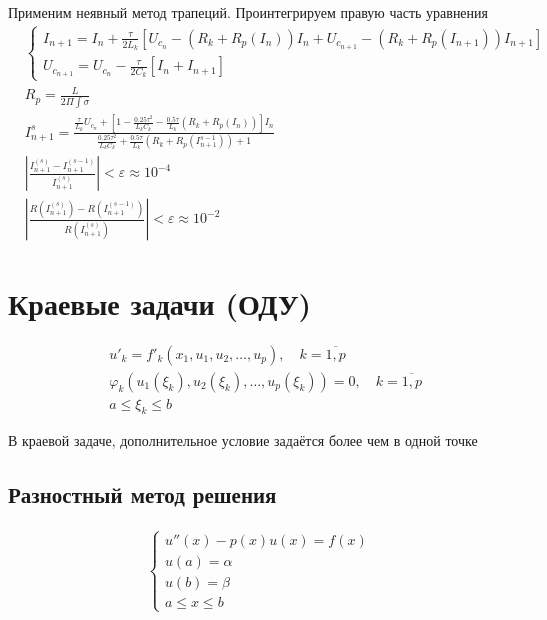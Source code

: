 Применим неявный метод трапеций. Проинтегрируем правую часть уравнения
\begin{align*}
	&\begin{cases*}
		I_{n+1} = I_n + \frac{\tau}{2 L_k} [U_{c_n} - (R_k + R_p(I_n)) I_n + U_{c_{n+1}} - (R_k + R_p(I_{n+1})) I_{n+1}]\\
		U_{c_{n+1}} = U_{c_n} - \frac{\tau}{2C_k} [ I_n + I_{n+1} ]
	\end{cases*}
	\\
	&R_p = \frac{L}{2\Pi \int \sigma}
	\\
	&I^{s}_{n+1} = \frac{\frac{\tau}{L_k} U_{c_n} + [  1 - \frac{0.25 \tau^2}{L_k C_k} - \frac{0.5 \tau}{L_k} (R_k + R_p(I_n))  ] I_n  }{  \frac{0.25\tau^2}{L_k C_k} + \frac{0.5 \tau}{L_k} ( R_k + R_p(I^{s-1}_{n+1}) ) + 1    }
	\\
	&\left|\frac{I^{(s)}_{n+1} - I^{(s-1)}_{n+1}}{I^{(s)}_{n+1}}\right| < \varepsilon \approx 10^{-4}
	\\
	&\left|\frac{R(I^{(s)}_{n+1}) - R(I^{(s-1)}_{n+1})}{R(I^{(s)}_{n+1})}\right| < \varepsilon \approx 10^{-2}
\end{align*}


\section{Краевые задачи (ОДУ)}

\begin{align*}
&u'_k =f'_k(x_1, u_1, u_2, \dots, u_p), \quad k = \overline{1, p}\\
&\varphi_k (u_1(\xi_k), u_2(\xi_k), \dots, u_p(\xi_k)) = 0, \quad k = \overline{1, p} \\
&a \leq \xi_k \leq b
\end{align*}

В краевой задаче, дополнительное условие задаётся более чем в одной точке


\subsection{Разностный метод решения}

\begin{align*}
	\begin{cases}
		u''(x) - p(x)u(x) = f(x)\\
		u(a) = \alpha\\
		u(b) = \beta\\
		a \leq x \leq b
	\end{cases}
\end{align*}

